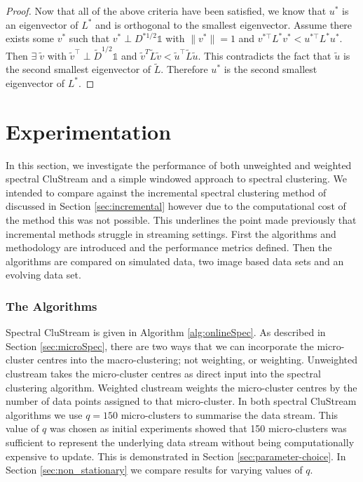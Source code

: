 \begin{proof}
Now that all of the above criteria have been satisfied, we know that $u^*$ is an eigenvector of $L^*$ and is orthogonal to the smallest eigenvector. Assume there exists some $v^*$ such that $v^* \perp D^{* 1/2}\mathds{1}$ with $\|v^*\|=1$ and $v^{* \top}L^*v^* < u^{* \top}L^*u^*$. Then $\exists \; \tilde{v}$ with $\tilde{v}^{\top} \perp \tilde{D}^{1/2}\mathds{1}$ and $\tilde{v}^T \tilde{L} \tilde{v} < \tilde{u}^{\top} \tilde{L} \tilde{u}$. This contradicts the fact that $\tilde{u}$ is the second smallest eigenvector of $\tilde{L}$. Therefore $u^*$ is the second smallest eigenvector of $L^*$.

\end{proof}
 
\section{Experimentation}
\label{sec:clustream_exp}

In this section, we investigate the performance of both unweighted and weighted spectral CluStream and a simple windowed approach to spectral clustering. We intended to compare against  the incremental spectral clustering method of \cite{Ning2010} discussed in Section \ref{sec:incremental} however due to the computational cost of the method this was not possible. This underlines the point made previously that incremental methods struggle in streaming settings. First the algorithms and methodology are introduced and the performance metrics defined. Then the algorithms are compared on simulated data, two image based data sets and an evolving data set. 

\subsubsection{The Algorithms}
\label{sec:algorithms}
Spectral CluStream is given in Algorithm \ref{alg:onlineSpec}. As described in Section \ref{sec:microSpec}, there are two  ways that we can incorporate the micro-cluster centres into the macro-clustering; not weighting, or weighting. Unweighted clustream takes the micro-cluster centres as direct input into the spectral clustering algorithm. Weighted clustream weights the micro-cluster centres by the number of data points assigned to that micro-cluster. In both spectral CluStream algorithms we use $q = 150$ micro-clusters to summarise the data stream. This value of $q$ was chosen as initial experiments showed that 150 micro-clusters was sufficient to represent the underlying data stream without being computationally expensive to update. This is demonstrated in Section \ref{sec:parameter-choice}. In Section \ref{sec:non_stationary} we compare results for varying values of $q$.

